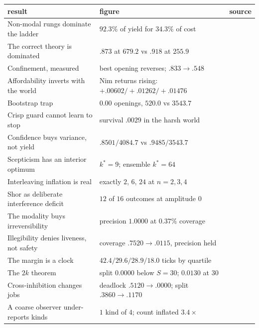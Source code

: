 \begin{tabular}{@{}>{\raggedright\arraybackslash}p{5.4cm}>{\raggedright\arraybackslash}p{4.4cm}>{\raggedright\arraybackslash}p{4.2cm}@{}}
\toprule
result & figure & source \\
\midrule
Non-modal rungs dominate the ladder
  & $92.3\%$ of yield for $34.3\%$ of cost
  & \cite{GameNote} \\
The correct theory is dominated
  & $.873$ at $679.2$ vs $.918$ at $255.9$
  & \cite{GameNote} \\
Confinement, measured
  & best opening reverses; $.833 \to .548$
  & \cite{GameNote} \\
Affordability inverts with the world
  & Nim returns rising: $+.00602/+.01262/+.01476$
  & \cite{ComposeNote} \\
Bootstrap trap
  & $0.00$ openings, $520.0$ vs $3543.7$
  & \cite{GradedWhere} \\
Crisp guard cannot learn to stop
  & survival $.0029$ in the harsh world
  & \cite{GradedWhere} \\
Confidence buys variance, not yield
  & $.8501/4084.7$ vs $.9485/3543.7$
  & \cite{GradedWhere} \\
Scepticism has an interior optimum
  & $k^{*} = 9$; ensemble $k^{*} = 64$
  & \cite{GradedWhere} \\
Interleaving inflation is real
  & exactly $2$, $6$, $24$ at $n=2,3,4$
  & \cite{GradedWhere} \\
Shor as deliberate interference deficit
  & $12$ of $16$ outcomes at amplitude $0$
  & \cite{GradedWhere} \\
The modality buys irreversibility
  & precision $1.0000$ at $0.37\%$ coverage
  & \cite{QuorumNote} \\
Illegibility denies liveness, not safety
  & coverage $.7520 \to .0115$, precision held
  & \cite{QuorumNote} \\
The margin is a clock
  & $42.4/29.6/28.9/18.0$ ticks by quartile
  & \cite{QuorumNote} \\
The $2k$ theorem
  & split $0.0000$ below $S=30$; $0.0130$ at $30$
  & \cite{QuorumNote} \\
Cross-inhibition changes jobs
  & deadlock $.5120\to.0000$; split $.3860\to.1170$
  & \cite{QuorumNote} \\
A coarse observer under-reports kinds
  & $1$ kind of $4$; count inflated $3.4\times$
  & \cite{ScopeNote} \\
\bottomrule
\end{tabular}

